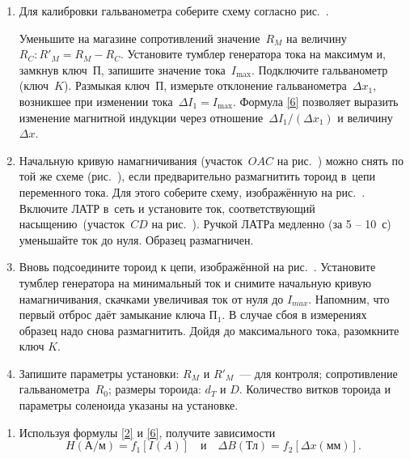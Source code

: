 \begin{lab:task}
\begin{enumerate}

	\item Для калибровки гальванометра соберите схему согласно рис.~.

	Уменьшите на магазине сопротивлений значение~$R_M$ на
	величину~$R_C: R'_M=R_M-R_C$. Установите тумблер генератора тока на максимум и, замкнув ключ~$\text{П}$, запишите значение
	тока~$I_{\max}$. Подключите гальванометр (ключ~$K$). Размыкая ключ~$\text{П}$, измерьте отклонение гальванометра~$\Delta x_1$,
	возникшее при изменении тока~$\Delta I_1=I_{\max}$. Формула \eqref{6} позволяет выразить изменение магнитной индукции через
	отношение~$\Delta I_1/(\Delta x_1)$ и величину~$\Delta x$.


	\item Начальную кривую намагничивания (участок~$OAC$ на рис.~) можно снять по той же схеме (рис.~), если предварительно
	размагнитить тороид в~цепи переменного тока. Для этого соберите схему, изображённую на рис.~. Включите ЛАТР в~сеть и
	установите ток, соответствующий насыщению~(участок~$CD$ на рис.~). Ручкой ЛАТРа медленно (за 5 -- 10~с) уменьшайте ток до
	нуля. Образец размагничен.

	\item Вновь подсоедините тороид к цепи, изображённой на рис.~. Установите тумблер генератора на минимальный ток и снимите  начальную кривую намагничивания,  скачками увеличивая ток от нуля до $I_{max}$. Напомним, что первый отброс даёт замыкание ключа $\text{П}_1$.  В случае сбоя в измерениях образец надо снова размагнитить.
	Дойдя до максимального тока,  разомкните ключ $K$.

	\item Запишите параметры установки: $R_M$ и $R'_M$~--- для контроля; сопротивление гальванометра~$R_0$; размеры тороида:
	$d_T$ и $D$. Количество витков тороида и параметры соленоида указаны на установке.

	\end{enumerate}


	\begin{enumerate}

		\item Используя формулы \eqref{2} и \eqref{6}, получите зависимости
		\begin{equation*}
			H(\text{А/м})=f_1[I(A)]\quad и\quad \Delta B(\text{Тл})=f_2[\Delta x(\text{мм})].
		\end{equation*}


\end{enumerate}
\end{lab:task}
